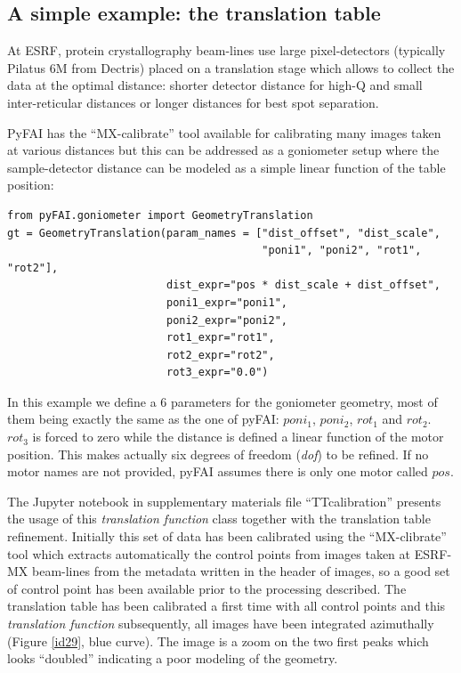 \documentclass[preprint, pdf]{iucr}              %
\begin{document}
\subsection{A simple example: the translation table}

At ESRF, protein crystallography beam-lines use large pixel-detectors (typically
Pilatus 6M from Dectris) placed on a translation stage which allows to collect
the data at the optimal distance: shorter detector distance for high-Q and small
inter-reticular distances or longer distances for best spot separation.

PyFAI has the ``MX-calibrate'' tool available for calibrating many images taken
at various distances but this can be addressed as a goniometer setup where the
sample-detector distance can be modeled as a simple linear function of the table
position:

\begin{verbatim}
from pyFAI.goniometer import GeometryTranslation
gt = GeometryTranslation(param_names = ["dist_offset", "dist_scale", 
                                        "poni1", "poni2", "rot1", "rot2"],
                         dist_expr="pos * dist_scale + dist_offset", 
                         poni1_expr="poni1",
                         poni2_expr="poni2", 
                         rot1_expr="rot1", 
                         rot2_expr="rot2", 
                         rot3_expr="0.0")
\end{verbatim}
 
In this example we define a 6 parameters for the goniometer geometry, most of
them being exactly the same as the one of pyFAI: $poni_1$, $poni_2$, $rot_1$
and $rot_2$. $rot_3$ is forced to zero while the distance is defined a
linear function of the motor position. 
This makes actually six degrees of freedom  (\textit{dof}) to be refined.
If no motor names are not provided, pyFAI assumes there is only one motor
called $pos$.

The Jupyter notebook \cite{ipython} in supplementary materials file
``TTcalibration'' presents the usage of this \textit{translation function} class
together with the translation table refinement. 
Initially this set of data has been calibrated using the ``MX-clibrate'' tool
which extracts automatically the control points from images taken at ESRF-MX
beam-lines from the metadata written in the header of images, so a good set
of control point has been available prior to the processing described. 
The translation table has been calibrated a first time with all control points
and this \textit{translation function} subsequently, all images have been
integrated azimuthally (Figure \ref{id29}, blue curve). 
The image is a zoom on the two first peaks which looks ``doubled'' indicating a
poor modeling of the geometry.
\end{document}
